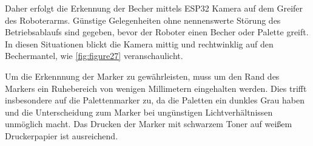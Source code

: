     Daher erfolgt die Erkennung der Becher mittels ESP32 Kamera auf dem Greifer des Roboterarms.
    Günstige Gelegenheiten ohne nennenswerte Störung des Betriebsablaufs sind gegeben, bevor der Roboter einen Becher oder Palette greift.
    In diesen Situationen blickt die Kamera mittig und rechtwinklig auf den Bechermantel, wie \ref{fig:figure27} veranschaulicht.

    Um die Erkennnung der Marker zu gewährleisten, muss um den Rand des Markers ein \glqq Ruhebereich \grqq von wenigen Millimetern eingehalten werden.
    Dies trifft insbesondere auf die Palettenmarker zu, da die Paletten ein dunkles Grau haben und die Unterscheidung zum Marker bei ungünstigen Lichtverhältnissen unmöglich macht.
    Das Drucken der Marker mit schwarzem Toner auf weißem Druckerpapier ist ausreichend.


